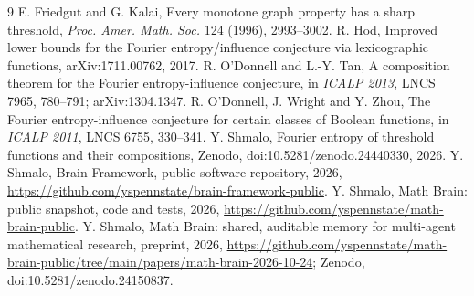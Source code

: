 \documentclass[11pt]{amsart}
\theoremstyle{remark}
\begin{document}
\begin{thebibliography}{9}
 E. Friedgut and G. Kalai, Every monotone graph property has a sharp threshold, \emph{Proc. Amer. Math. Soc.} 124 (1996), 2993--3002.
 R. Hod, Improved lower bounds for the Fourier entropy/influence conjecture via lexicographic functions, arXiv:1711.00762, 2017.
 R. O'Donnell and L.-Y. Tan, A composition theorem for the Fourier entropy-influence conjecture, in \emph{ICALP 2013}, LNCS 7965, 780--791; arXiv:1304.1347.
 R. O'Donnell, J. Wright and Y. Zhou, The Fourier entropy-influence conjecture for certain classes of Boolean functions, in \emph{ICALP 2011}, LNCS 6755, 330--341.
 Y. Shmalo, Fourier entropy of threshold functions and their compositions, Zenodo, doi:10.5281/zenodo.24440330, 2026.
 Y. Shmalo, Brain Framework, public software repository, 2026, \url{https://github.com/yspennstate/brain-framework-public}.
 Y. Shmalo, Math Brain: public snapshot, code and tests, 2026, \url{https://github.com/yspennstate/math-brain-public}.
 Y. Shmalo, Math Brain: shared, auditable memory for multi-agent mathematical research, preprint, 2026, \url{https://github.com/yspennstate/math-brain-public/tree/main/papers/math-brain-2026-10-24}; Zenodo, doi:10.5281/zenodo.24150837.
\end{thebibliography}
\end{document}
